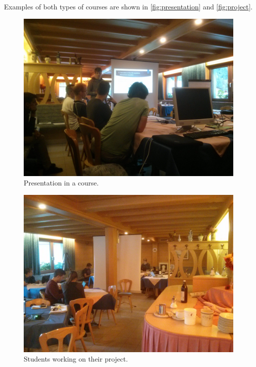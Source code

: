Examples of both types of courses are shown in \autoref{fig:presentation} and \autoref{fig:project}.
\begin{figure}[ht]%
 	\begin{center}%
 		\includegraphics[scale=0.0455]{img/Presentation.jpg}%
 		\caption{Presentation in a course.}\label{fig:presentation}%
 	\end{center}%
\end{figure}
\begin{figure}[ht]%
 	\begin{center}%
 		\includegraphics[scale=0.0455]{img/Project.jpg}%
 		\caption{Students working on their project.}\label{fig:project}%
 	\end{center}%
\end{figure}


